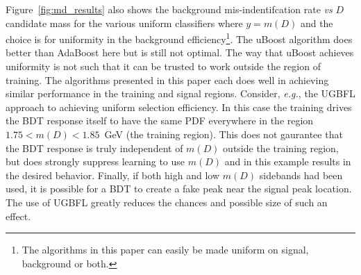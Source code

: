Figure~\ref{fig:md_results} also shows the background mis-indentifcation rate {\em vs} $D$ candidate mass for the various uniform classifiers where $y = m(D)$ and the choice is for uniformity in the background efficiency\footnote{The algorithms in this paper can easily be made uniform on signal, background or both.}.  
The uBoost algorithm does better than AdaBoost here but is still not optimal.  The way that uBoost achieves uniformity is not such that it can be trusted to work outside the region of training.  The algorithms presented in this paper each does well in achieving similar performance in the training and signal regions.  
Consider, {\em e.g.}, the UGBFL approach to achieving uniform selection efficiency.  In this case the training drives the BDT response itself to have the same PDF everywhere in the region $1.75 < m(D) < 1.85$~GeV (the training region).  
This does not gaurantee that the BDT response is truly independent of $m(D)$ outside the training region, but does strongly suppress learning to use $m(D)$ and in this example results in the desired behavior.  
Finally, if both high and low $m(D)$ sidebands had been used, it is possible for a BDT to create a fake peak near the signal peak location.  The use of UGBFL greatly reduces the chances and possible size of such an effect.


